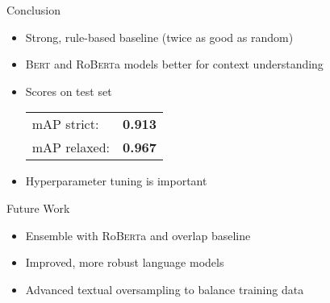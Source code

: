 \documentclass[english,handout]{mlutalk}
\newcommand{\Bert}{\textsc{Bert}\xspace}
\newcommand{\Roberta}{\mbox{Ro\textsc{Bert}a}\xspace}
\begin{document}
\begin{frame}{Conclusion}
  \begin{itemize}
    \item Strong, rule-based baseline (twice as good as random)
    \item \Bert and \Roberta models better for context understanding
    \item Scores on test set \\[0.75ex]
    \begin{tabular}{@{}lc@{}}
      mAP strict: & \textbf{0.913} \\
      mAP relaxed: & \textbf{0.967}
    \end{tabular}
    \item Hyperparameter tuning is important
  \end{itemize}

  \begin{block}{Future Work}
    \begin{itemize}
      \item Ensemble with \Roberta and overlap baseline
      \item Improved, more robust language models~\cite{Sun2021WFDPSLCZLLWGLSSLOYTWW}
    \item Advanced textual oversampling to balance training data
    \end{itemize}
  \end{block}
  \thankyou
\end{frame}

\appendix
\section{\appendixname}

\bibliographyframe
\end{document}
